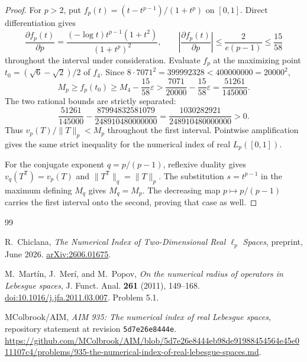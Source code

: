 \documentclass[11pt,a4paper]{article}
\theoremstyle{remark}
\begin{document}
\begin{proof}
For $p>2$, put $f_p(t)=(t-t^{p-1})/(1+t^p)$ on $[0,1]$.
Direct differentiation gives
\[
 \frac{\partial f_p(t)}{\partial p}
 =\frac{(-\log t)t^{p-1}(1+t^2)}{(1+t^p)^2},
 \qquad
 \left|\frac{\partial f_p(t)}{\partial p}\right|
 \le\frac{2}{e(p-1)}\le\frac{15}{58}
\]
throughout the interval under consideration. Evaluate $f_p$ at the maximizing
point $t_0=(\sqrt6-\sqrt2)/2$ of $f_4$. Since
$8\cdot7071^2=399992328<400000000=20000^2$,
\[
 M_p\ge f_p(t_0)
 \ge M_4-\frac{15}{58}\varepsilon
 >\frac{7071}{20000}-\frac{15}{58}\varepsilon
 =\frac{51261}{145000}.
 \tag{935.15}\label{eq:935-Mp}
\]
The two rational bounds are strictly separated:
\[
 \frac{51261}{145000}
 -\frac{87994832581079}{248910480000000}
 =\frac{1030282921}{248910480000000}>0.
\]
Thus $v_p(T)/\|T\|_p<M_p$ throughout the first interval.
Pointwise amplification gives the same strict inequality for the numerical
index of real $L_p([0,1])$.

For the conjugate exponent $q=p/(p-1)$, reflexive duality gives
$v_q(T^{\mathsf T})=v_p(T)$ and
$\|T^{\mathsf T}\|_q=\|T\|_p$. The substitution $s=t^{p-1}$ in the
maximum defining $M_q$ gives $M_q=M_p$. The decreasing map
$p\mapsto p/(p-1)$ carries the first interval onto the second, proving
that case as well.
\end{proof}



\begin{thebibliography}{99}
\small
\setlength{\itemsep}{3pt}

R.~Chiclana,
\emph{The Numerical Index of Two-Dimensional Real $\ell_p$ Spaces},
preprint, June 2026.
\href{https://arxiv.org/abs/2606.01675}{arXiv:2606.01675}.

M.~Mart\'in, J.~Mer\'i, and M.~Popov,
\emph{On the numerical radius of operators in Lebesgue spaces},
J. Funct. Anal. \textbf{261} (2011), 149--168.
\href{https://doi.org/10.1016/j.jfa.2011.03.007}{doi:10.1016/j.jfa.2011.03.007}.
Problem 5.1.

MColbrook/AIM, \emph{AIM 935: The numerical index of real Lebesgue spaces},
repository statement at revision \texttt{5d7e26e8444e}.
\url{https://github.com/MColbrook/AIM/blob/5d7e26e8444eb98de91988454564e45e011107c4/problems/935-the-numerical-index-of-real-lebesgue-spaces.md}.
\end{thebibliography}
\end{document}
